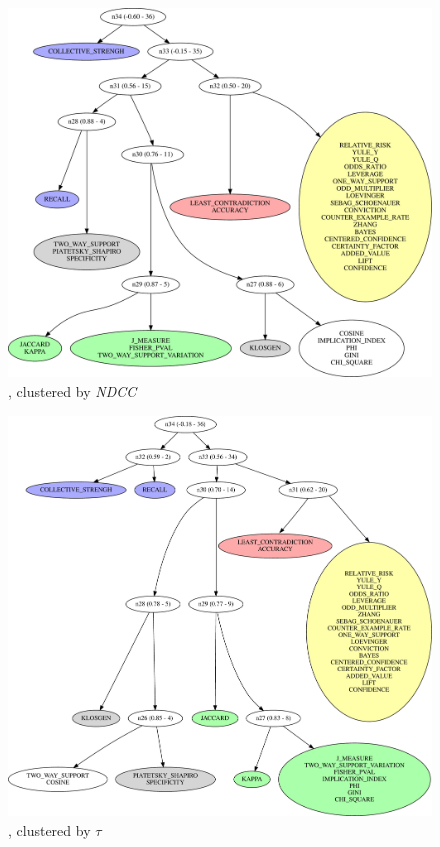 \begin{figure}[th!]
  \begin{center}
  \includegraphics[width=\textwidth]{svg/rankingcom/patterns_prods_per_ticket-perTarget-NDCG.pdf}
  \caption{\prodassocreceipt, clustered by {\em NDCC}}
  \end{center}
\end{figure}

\begin{figure}[th!]
  \begin{center}
  \includegraphics[width=\textwidth]{svg/rankingcom/patterns_prods_per_client2-perTarget-KENDAL.pdf}
  \caption{\prodassocclient, clustered by $\tau$}
  \end{center}
\end{figure}

